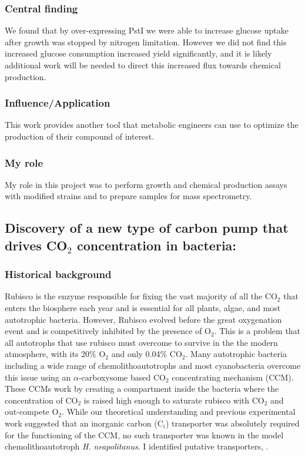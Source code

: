 \documentclass{article}
\begin{document}
\subsubsection{Central finding}
We found that by over-expressing PstI we were able to increase glucose uptake after growth was stopped by nitrogen limitation. 
However we did not find this increased glucose consumption increased yield significantly, and it is likely additional work will be needed to direct this increased flux towards chemical production.
%
\subsubsection{Influence/Application}
This work provides another tool that metabolic engineers can use to optimize the production of their compound of interest.
%
\subsubsection{My role}
My role in this project was to perform growth and chemical production assays with modified strains and to prepare samples for mass spectrometry.
%
\nocite{Chubukov2017-uu}
\printbibliography[heading=none]

\leavevmode\pagebreak


\newrefsection
\subsection{Discovery of a new type of carbon pump that drives CO$_2$ concentration in bacteria:}
\subsubsection{Historical background}
Rubisco is the enzyme responsible for fixing the vast majority of all the CO$_2$ that enters the biosphere each year and is essential for all plants, algae, and most autotrophic bacteria. 
However, Rubisco evolved before the great oxygenation event and is competitively inhibited by the presence of O$_2$.
This is a problem that all autotrophs that use rubisco must overcome to survive in the the modern atmosphere, with its 20\% O$_2$ and only 0.04\% CO$_2$.
Many autotrophic bacteria including a wide range of chemolithoautotrophs and most cyanobacteria overcome this issue using an $\alpha$-carboxysome based CO$_2$ concentrating mechanism (CCM).
These CCMs work by creating a compartment inside the bacteria where the concentration of CO$_2$ is raised high enough to saturate rubisco with CO$_2$ and out-compete O$_2$.
While our theoretical understanding and previous experimental work suggested that an inorganic carbon (C$_i$) transporter was absolutely required for the functioning of the CCM, no such transporter was known in the model chemolithoautotroph \textit{H. neapolitanus}.
I identified putative transporters, .
%
\end{document}
